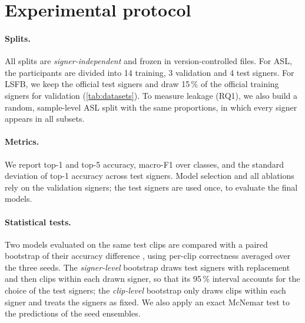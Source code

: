 \section{Experimental protocol}
\label{sec:protocol}

\paragraph{Splits.} All splits are \emph{signer-independent} and frozen in version-controlled
files. For ASL, the \numAslSigners{} participants are divided into 14 training, 3 validation and 4
test signers. For LSFB, we keep the official test signers and draw 15\,\% of the official training
signers for validation (\cref{tab:datasets}). To measure leakage (RQ1), we also build a random,
sample-level ASL split with the same proportions, in which every signer appears in all subsets.

\paragraph{Metrics.} We report top-1 and top-5 accuracy, macro-F1 over classes, and the standard
deviation of top-1 accuracy across test signers. Model selection and all ablations rely on the
validation signers; the test signers are used once, to evaluate the final models.

\paragraph{Statistical tests.} Two models evaluated on the same test clips are compared with a
paired bootstrap of their accuracy difference \citep{efron1993bootstrap}, using per-clip
correctness averaged over the three seeds. The \emph{signer-level} bootstrap draws test signers
with replacement and then clips within each drawn signer, so that its 95\,\% interval accounts for
the choice of the test signers; the \emph{clip-level} bootstrap only draws clips within each signer
and treats the signers as fixed. We also apply an exact McNemar test \citep{mcnemar1947note} to the
predictions of the seed ensembles.

